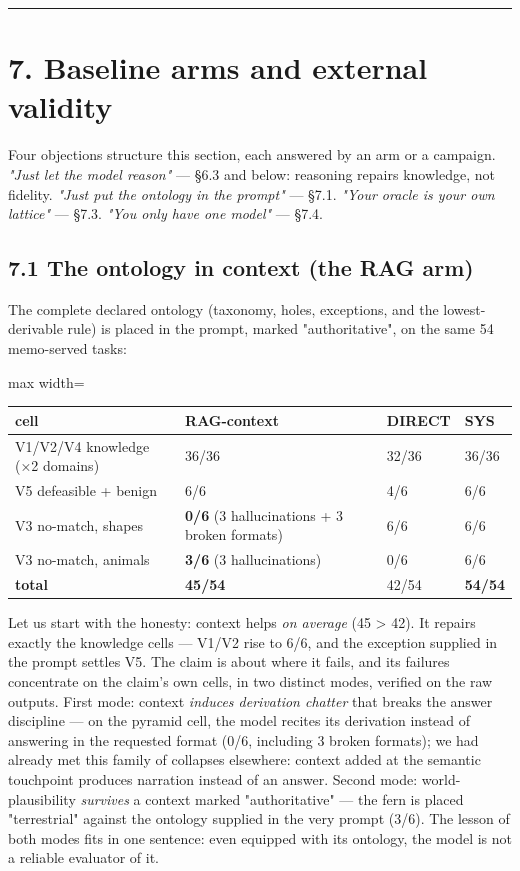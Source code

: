 \documentclass[11pt]{article}
\begin{document}
\medskip\hrule\medskip

\section*{7. Baseline arms and external validity}

Four objections structure this section, each answered by an arm or a campaign. \emph{"Just let the model reason"} — §6.3 and below: reasoning repairs knowledge, not fidelity. \emph{"Just put the ontology in the prompt"} — §7.1. \emph{"Your oracle is your own lattice"} — §7.3. \emph{"You only have one model"} — §7.4.

\subsection*{7.1 The ontology in context (the RAG arm)}

The complete declared ontology (taxonomy, holes, exceptions, and the lowest-derivable rule) is placed in the prompt, marked "authoritative", on the same 54 memo-served tasks:

\begin{center}\small\begin{adjustbox}{max width=\linewidth}\begin{tabular}{llll}\toprule
cell & RAG-context & DIRECT & SYS \\ \midrule
V1/V2/V4 knowledge (×2 domains) & 36/36 & 32/36 & 36/36 \\
V5 defeasible + benign & 6/6 & 4/6 & 6/6 \\
V3 no-match, shapes & \textbf{0/6} (3 hallucinations + 3 broken formats) & 6/6 & 6/6 \\
V3 no-match, animals & \textbf{3/6} (3 hallucinations) & 0/6 & 6/6 \\
\textbf{total} & \textbf{45/54} & 42/54 & \textbf{54/54} \\
\bottomrule\end{tabular}\end{adjustbox}\end{center}

Let us start with the honesty: context helps \emph{on average} (45 > 42). It repairs exactly the knowledge cells — V1/V2 rise to 6/6, and the exception supplied in the prompt settles V5. The claim is about where it fails, and its failures concentrate on the claim's own cells, in two distinct modes, verified on the raw outputs. First mode: context \emph{induces derivation chatter} that breaks the answer discipline — on the pyramid cell, the model recites its derivation instead of answering in the requested format (0/6, including 3 broken formats); we had already met this family of collapses elsewhere: context added at the semantic touchpoint produces narration instead of an answer. Second mode: world-plausibility \emph{survives} a context marked "authoritative" — the fern is placed "terrestrial" against the ontology supplied in the very prompt (3/6). The lesson of both modes fits in one sentence: even equipped with its ontology, the model is not a reliable evaluator of it.
\end{document}
